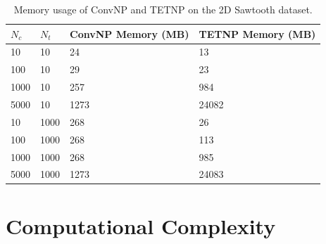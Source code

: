 \documentclass[../../main.tex]{subfiles}
\begin{document}
\begin{table}[]
    \centering
    \begin{tabular}{@{}llll@{}}
    \toprule
    $N_c$ & $N_t$ & ConvNP Memory (MB) & TETNP Memory (MB) \\ \midrule
    10    & 10    & 24                 & 13                \\
    100   & 10    & 29                 & 23                \\
    1000  & 10    & 257                & 984               \\
    5000  & 10    & 1273               & 24082             \\ \midrule
    10    & 1000  & 268                & 26                \\
    100   & 1000  & 268                & 113               \\
    1000  & 1000  & 268                & 985               \\
    5000  & 1000  & 1273               & 24083             \\ \bottomrule
    \end{tabular}
    \caption{Memory usage of ConvNP and TETNP on the 2D Sawtooth dataset.}
    \label{tab:memory-usage-comparison-2D}
    \end{table}


\section{Computational Complexity}


\ifSubfilesClassLoaded{%
    \printbibliography{}
}{} 
\end{document}
